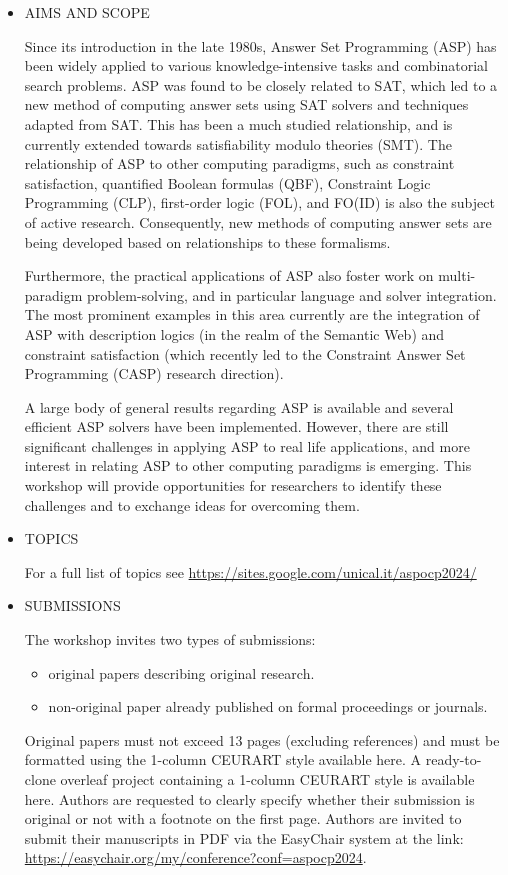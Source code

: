 \documentclass[prodmode,acmtecs]{acmsmall} %
\begin{document}
\begin{itemize}\item  AIMS AND SCOPE 
 
  Since its introduction in the late 1980s, Answer Set Programming (ASP) has been widely applied to various knowledge-intensive tasks and combinatorial search problems. ASP was found to be closely related to SAT, which led to a new method of computing answer sets using SAT solvers and techniques adapted from SAT. This has been a much studied relationship, and is currently extended towards satisfiability modulo theories (SMT). The relationship of ASP to other computing paradigms, such as constraint satisfaction, quantified Boolean formulas (QBF), Constraint Logic Programming (CLP), first-order logic (FOL), and FO(ID) is also the subject of active research. Consequently, new methods of computing answer sets are being developed based on relationships to these formalisms. 
 
   Furthermore, the practical applications of ASP also foster work on multi-paradigm problem-solving, and in particular language and solver integration. The most prominent examples in this area currently are the integration of ASP with description logics (in the realm of the Semantic Web) and constraint satisfaction (which recently led to the Constraint Answer Set Programming (CASP) research direction). 
 
  A large body of general results regarding ASP is available and several efficient ASP solvers have been implemented. However, there are still significant challenges in applying ASP to real life applications, and more interest in relating ASP to other computing paradigms is emerging. This  workshop will provide opportunities for researchers to identify these challenges and to exchange ideas for overcoming them. 
 
\item  TOPICS 
 
  For a full list of topics see \href{https://sites.google.com/unical.it/aspocp2024/}{https://sites.google.com/unical.it/aspocp2024/} 
 
\item  SUBMISSIONS 
 
  The workshop invites two types of submissions: 
 
\begin{itemize}\item  original papers describing original research.
\item  non-original paper already published on formal proceedings or journals.
\end{itemize} 
  Original papers must not exceed 13 pages (excluding references) and must be formatted using the 1-column CEURART style available here. A ready-to-clone overleaf project containing a 1-column CEURART style is available here. Authors are requested to clearly specify whether their submission is original or not with a footnote on the first page. Authors are invited to submit their manuscripts in PDF via the EasyChair system at the link: \href{https://easychair.org/my/conference?conf=aspocp2024}{https://easychair.org/my/conference?conf=aspocp2024}. 
 

\end{itemize}
\end{document}
